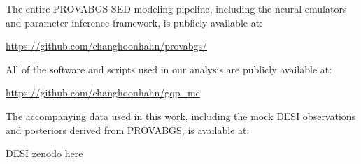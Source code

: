 The entire PROVABGS SED modeling pipeline, including the neural emulators and
parameter inference framework, is publicly available at:
\begin{center}
    \url{https://github.com/changhoonhahn/provabgs/}
\end{center}
All of the software and scripts used in our analysis are publicly available at:
\begin{center}
    \url{https://github.com/changhoonhahn/gqp_mc}
\end{center}
The accompanying data used in this work, including the mock DESI observations
and posteriors derived from PROVABGS, is available at: 
\begin{center}
    \url{DESI zenodo here}
\end{center}

